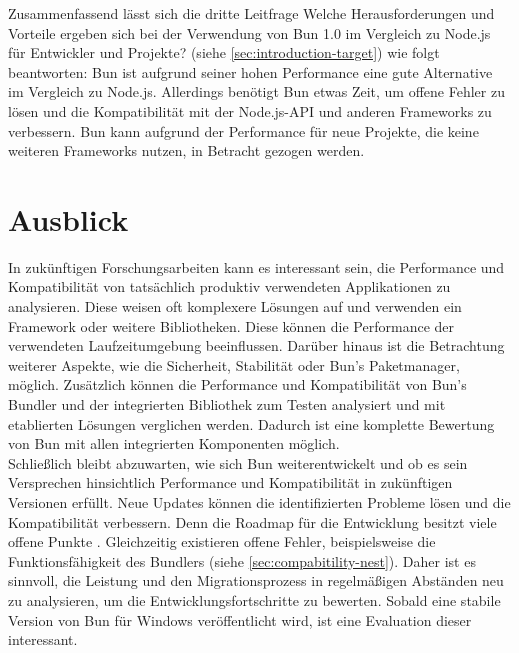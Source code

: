 \noindent
Zusammenfassend lässt sich die dritte Leitfrage \glqq Welche Herausforderungen und Vorteile ergeben sich bei der Verwendung von Bun 1.0 im Vergleich zu Node.js für Entwickler und Projekte?\grqq{} (siehe \autoref{sec:introduction-target}) wie folgt beantworten: Bun ist aufgrund seiner hohen Performance eine gute Alternative im Vergleich zu Node.js. Allerdings benötigt Bun etwas Zeit, um offene Fehler zu lösen und die Kompatibilität mit der Node.js-API und anderen Frameworks zu verbessern. Bun kann aufgrund der Performance für neue Projekte, die keine weiteren Frameworks nutzen, in Betracht gezogen werden.


\section{Ausblick} \label{sec:finalThoughts-outlook}
In zukünftigen Forschungsarbeiten kann es interessant sein, die Performance und Kompatibilität von tatsächlich produktiv verwendeten Applikationen zu analysieren. Diese weisen oft komplexere Lösungen auf und verwenden ein Framework oder weitere Bibliotheken. Diese können die Performance der verwendeten Laufzeitumgebung beeinflussen. Darüber hinaus ist die Betrachtung weiterer Aspekte, wie die Sicherheit, Stabilität oder Bun's Paketmanager, möglich. Zusätzlich können die Performance und Kompatibilität von Bun's Bundler und der integrierten Bibliothek zum Testen analysiert und mit etablierten Lösungen verglichen werden. Dadurch ist eine komplette Bewertung von Bun mit allen integrierten Komponenten möglich.\\

\noindent
Schließlich bleibt abzuwarten, wie sich Bun weiterentwickelt und ob es sein Versprechen hinsichtlich Performance und Kompatibilität in zukünftigen Versionen erfüllt. Neue Updates können die identifizierten Probleme lösen und die Kompatibilität verbessern. Denn die Roadmap für die Entwicklung besitzt viele offene Punkte \cite{Sumner.2022}. Gleichzeitig existieren offene Fehler, beispielsweise die Funktionsfähigkeit des Bundlers (siehe \autoref{sec:compabitility-nest}). Daher ist es sinnvoll, die Leistung und den Migrationsprozess in regelmäßigen Abständen neu zu analysieren, um die Entwicklungsfortschritte zu bewerten. Sobald eine stabile Version von Bun für Windows veröffentlicht wird, ist eine Evaluation dieser interessant.
